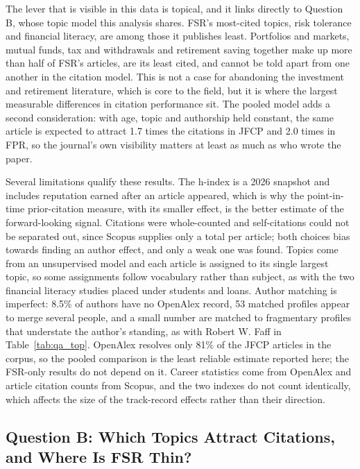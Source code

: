 \documentclass[11pt,a4paper]{article}
\begin{document}
The lever that is visible in this data is topical, and it links directly to Question B, whose topic model this analysis shares. FSR's most-cited topics, risk tolerance and financial literacy, are among those it publishes least. Portfolios and markets, mutual funds, tax and withdrawals and retirement saving together make up more than half of FSR's articles, are its least cited, and cannot be told apart from one another in the citation model. This is not a case for abandoning the investment and retirement literature, which is core to the field, but it is where the largest measurable differences in citation performance sit. The pooled model adds a second consideration: with age, topic and authorship held constant, the same article is expected to attract 1.7 times the citations in JFCP and 2.0 times in FPR, so the journal's own visibility matters at least as much as who wrote the paper.

Several limitations qualify these results. The h-index is a 2026 snapshot and includes reputation earned after an article appeared, which is why the point-in-time prior-citation measure, with its smaller effect, is the better estimate of the forward-looking signal. Citations were whole-counted and self-citations could not be separated out, since Scopus supplies only a total per article; both choices bias towards finding an author effect, and only a weak one was found. Topics come from an unsupervised model and each article is assigned to its single largest topic, so some assignments follow vocabulary rather than subject, as with the two financial literacy studies placed under students and loans. Author matching is imperfect: 8.5\% of authors have no OpenAlex record, 53 matched profiles appear to merge several people, and a small number are matched to fragmentary profiles that understate the author's standing, as with Robert W. Faff in Table~\ref{tab:qa_top}. OpenAlex resolves only 81\% of the JFCP articles in the corpus, so the pooled comparison is the least reliable estimate reported here; the FSR-only results do not depend on it. Career statistics come from OpenAlex and article citation counts from Scopus, and the two indexes do not count identically, which affects the size of the track-record effects rather than their direction.

\subsection{Question B: Which Topics Attract Citations, and Where Is FSR Thin?}\label{question-b-which-topics-attract-citations-1}
\end{document}
